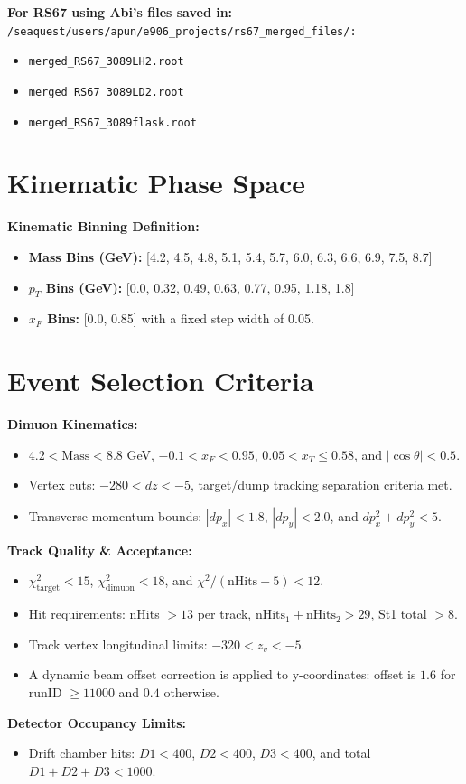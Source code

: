 \documentclass[12pt]{article}
\begin{document}
\vspace{0.2cm}
\textbf{For RS67 using Abi's files saved in:} \\
\texttt{/seaquest/users/apun/e906\_projects/rs67\_merged\_files/:}
\begin{itemize}
    \item \texttt{merged\_RS67\_3089LH2.root}
    \item \texttt{merged\_RS67\_3089LD2.root}
    \item \texttt{merged\_RS67\_3089flask.root}
\end{itemize}
\normalsize


\section{Kinematic Phase Space}

\textbf{Kinematic Binning Definition:}
\begin{itemize}
    \item \textbf{Mass Bins (GeV):} [4.2, 4.5, 4.8, 5.1, 5.4, 5.7, 6.0, 6.3, 6.6, 6.9, 7.5, 8.7]
    \item \textbf{$p_T$ Bins (GeV):} [0.0, 0.32, 0.49, 0.63, 0.77, 0.95, 1.18, 1.8]
    \item \textbf{$x_F$ Bins:} [0.0, 0.85] with a fixed step width of 0.05.
\end{itemize}


\section{Event Selection Criteria}

\textbf{Dimuon Kinematics:}
\begin{itemize}
    \item $4.2 < \text{Mass} < 8.8$ GeV, $-0.1 < x_F < 0.95$, $0.05 < x_T \le 0.58$, and $|\cos\theta| < 0.5$.
    \item Vertex cuts: $-280 < dz < -5$, target/dump tracking separation criteria met.
    \item Transverse momentum bounds: $|dp_x| < 1.8$, $|dp_y| < 2.0$, and $dp_x^2 + dp_y^2 < 5$.
\end{itemize}
\vspace{0.2cm}
\textbf{Track Quality \& Acceptance:}
\begin{itemize}
    \item $\chi^2_{\text{target}} < 15$, $\chi^2_{\text{dimuon}} < 18$, and $\chi^2/(\text{nHits}-5) < 12$.
    \item Hit requirements: nHits $> 13$ per track, $\text{nHits}_1+\text{nHits}_2 > 29$, St1 total $> 8$.
    \item Track vertex longitudinal limits: $-320 < z_v < -5$.
    \item A dynamic beam offset correction is applied to y-coordinates: offset is $1.6$ for runID $\ge 11000$ and $0.4$ otherwise.
\end{itemize}
\vspace{0.2cm}
\textbf{Detector Occupancy Limits:}
\begin{itemize}
    \item Drift chamber hits: $D1 < 400$, $D2 < 400$, $D3 < 400$, and total $D1+D2+D3 < 1000$.
\end{itemize}
\end{document}
